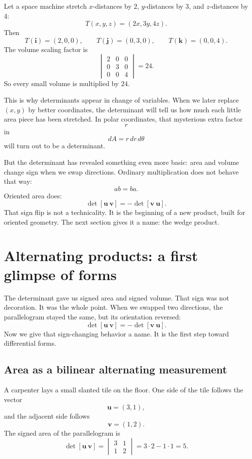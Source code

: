 \begin{example}
Let a space machine stretch \(x\)-distances by \(2\), \(y\)-distances by \(3\), and
\(z\)-distances by \(4\):
\[
    T(x,y,z)=(2x,3y,4z).
\]
Then
\[
    T(\mathbf i)=(2,0,0),
    \qquad
    T(\mathbf j)=(0,3,0),
    \qquad
    T(\mathbf k)=(0,0,4).
\]
The volume scaling factor is
\[
    \begin{vmatrix}
    2&0&0\\
    0&3&0\\
    0&0&4
    \end{vmatrix}
    =
    24.
\]
So every small volume is multiplied by \(24\).
\end{example}

This is why determinants appear in change of variables.  When we later replace
\((x,y)\) by better coordinates, the determinant will tell us how much each little area
piece has been stretched.  In polar coordinates, that mysterious extra factor
\[
    r
\]
in
\[
    dA=r\,dr\,d\theta
\]
will turn out to be a determinant.

But the determinant has revealed something even more basic: area and volume change
sign when we swap directions.  Ordinary multiplication does not behave that way:
\[
    ab=ba.
\]
Oriented area does:
\[
    \det[\mathbf u\ \mathbf v]=-\det[\mathbf v\ \mathbf u].
\]
That sign flip is not a technicality.  It is the beginning of a new product, built for
oriented geometry.  The next section gives it a name: the wedge product.
\section{Alternating products: a first glimpse of forms}

The determinant gave us signed area and signed volume.  That sign was not decoration.
It was the whole point.  When we swapped two directions, the parallelogram stayed the
same, but its orientation reversed:
\[
    \det[\mathbf u\ \mathbf v]
    =
    -\det[\mathbf v\ \mathbf u].
\]
Now we give that sign-changing behavior a name.  It is the first step toward
differential forms.

\subsection{Area as a bilinear alternating measurement}

A carpenter lays a small slanted tile on the floor.  One side of the tile follows the vector
\[
    \mathbf u=(3,1),
\]
and the adjacent side follows
\[
    \mathbf v=(1,2).
\]
The signed area of the parallelogram is
\[
    \det[\mathbf u\ \mathbf v]
    =
    \begin{vmatrix}
        3&1\\
        1&2
    \end{vmatrix}
    =
    3\cdot2-1\cdot1
    =
    5.
\]

